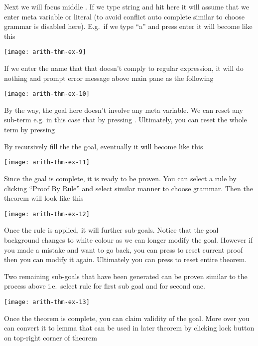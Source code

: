 \documentclass[master.tex]{subfiles}
\begin{document}
Next we will focus middle . If we type string and hit 
here it will assume that we enter meta variable or literal (to avoid conflict
auto complete similar to choose grammar is disabled here). E.g.\ if we type ``a''
and press enter it will become like this

\begin{center}
\texttt{[image: arith-thm-ex-9]}
\end{center}

If we enter the name that that doesn't comply to regular expression, it will
do nothing and prompt error message above main pane as the following

\begin{center}
\texttt{[image: arith-thm-ex-10]}
\end{center}

By the way, the goal here doesn't involve any meta variable. We can reset any
sub-term e.g. in this case that  by pressing . Ultimately,
you can reset the whole term by pressing 

By recursively fill the the goal, eventually it will become like this

\texttt{[image: arith-thm-ex-11]}

Since the goal is complete, it is ready to be proven. You can select a rule by
clicking ``Proof By Rule'' and select  similar manner to
choose grammar. Then the theorem will look like this

\texttt{[image: arith-thm-ex-12]}

Once the rule is applied, it will further sub-goals. Notice that the goal
background changes to white colour as we can longer modify the goal. However if
you made a mistake and want to go back, you can press  to reset
current proof then you can modify it again. Ultimately you can press
 to reset entire theorem.

Two remaining sub-goals that have been generated can be proven similar to the
process above i.e.\ select rule  for first sub goal and
 for second one.

\begin{center}
\texttt{[image: arith-thm-ex-13]}
\end{center}

Once the theorem is complete, you can claim validity of the goal. More over you
can convert it to lemma that can be used in later theorem by clicking lock
button on top-right corner of theorem
\end{document}
